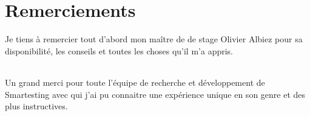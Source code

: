 \chapter*{Remerciements}

Je tiens à remercier tout d'abord mon maître de de stage Olivier Albiez pour sa disponibilité, les conseils et toutes les choses qu'il m'a appris.

\subparagraph*{}
Un grand merci pour toute l'équipe de recherche et développement de Smartesting avec qui j'ai pu connaitre une expérience unique en son genre et des plus instructives.

